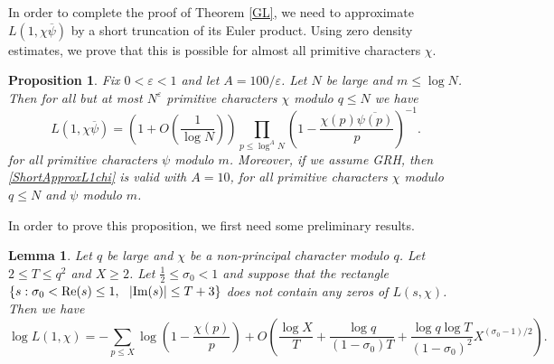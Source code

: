\documentclass[12pt]{amsart}
\newtheorem{lem}[thm]{Lemma}
\newtheorem{pro}[thm]{Proposition}
\theoremstyle{definition}
\numberwithin{equation}{section}
\renewcommand{\bar}{\overline}
\begin{document}
In order to complete the proof of Theorem \ref{GL}, we need to approximate $L(1,\chi\bar{\psi})$ by a short truncation of its Euler product. Using zero density estimates, we prove that this is possible for almost all primitive characters $\chi$. 
\begin{pro}\label{BoundExcep}
Fix $0<\varepsilon<1$ and let $A=100/\varepsilon$.   Let $N$ be large and $m \leq \log N$. Then for all but at most $N^{\varepsilon}$ primitive characters $\chi$ modulo $q \leq N$ we have
\begin{equation}\label{ShortApproxL1chi}
L(1,\chi\bar{\psi}) = \left(1+O\left(\frac{1}{\log N}\right)\right)\prod_{p \leq \log^A N} \left(1-\frac{\chi(p)\bar{\psi(p)}}{p}\right)^{-1} .
\end{equation}
for all primitive characters $\psi$ modulo $m$. Moreover, if we assume GRH, then \eqref{ShortApproxL1chi} is valid with $A=10$, for all primitive characters $\chi$ modulo $q\leq N$ and $\psi$ modulo $m$.
\end{pro}
In order to prove this proposition, we first need some preliminary results.
\begin{lem}\label{GoodLFunctions} Let $q$ be  large and $\chi$ be a non-principal character modulo $q$. Let $2\leq T\leq q^2$ and $X\geq 2$. 
Let $\frac{1}{2} \leq \sigma_0 < 1$ and suppose that the
rectangle $\{ s:  \sigma_0 <\textup{Re}(s) \leq 1, \ \
|\textup{Im}(s)| \leq T+3\}$ does not contain any zeros of $L(s,\chi)$.
Then we have
$$
\log L(1, \chi)= -\sum_{p\leq X} \log \left(1-\frac{\chi(p)}{p}\right)+O\left(\frac{\log X}{T}+\frac{\log q}{(1-\sigma_0)T}+ \frac{\log q \log T}{(1-\sigma_0)^2} X^{(\sigma_0-1)/2}\right).
$$
\end{lem}
\end{document}
